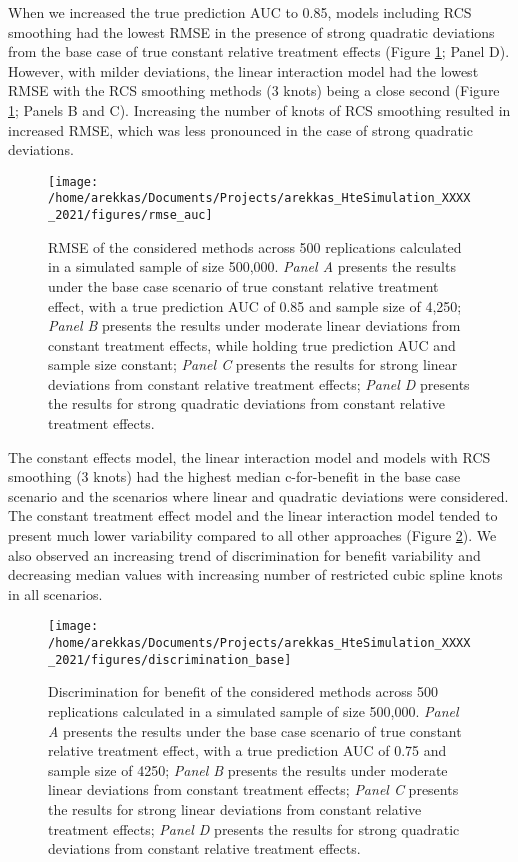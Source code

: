 \documentclass{article}
\begin{document}
When we increased the true prediction AUC to 0.85, models including RCS
smoothing had the lowest RMSE in the presence of strong quadratic
deviations from the base case of true constant relative treatment
effects (Figure \ref{fig:rmseauc}; Panel D). However, with milder
deviations, the linear interaction model had the lowest RMSE with the
RCS smoothing methods (3 knots) being a close second (Figure
\ref{fig:rmseauc}; Panels B and C). Increasing the number of knots of
RCS smoothing resulted in increased RMSE, which was less pronounced in
the case of strong quadratic deviations.

\begin{figure}
\texttt{[image: /home/arekkas/Documents/Projects/arekkas\_HteSimulation\_XXXX\_2021/figures/rmse\_auc]} \caption{RMSE of the considered methods across 500 replications calculated in a simulated sample of size 500,000. \textit{Panel A} presents the results under the base case scenario of true constant relative treatment effect, with a true prediction AUC of 0.85 and sample size of 4,250; \textit{Panel B} presents the results under moderate linear deviations from constant treatment effects, while holding true prediction AUC and sample size constant; \textit{Panel C} presents the results for strong linear deviations from constant relative treatment effects; \textit{Panel D} presents the results for strong quadratic deviations from constant relative treatment effects.}\label{fig:rmseauc}
\end{figure}

The constant effects model, the linear interaction model and models with
RCS smoothing (3 knots) had the highest median c-for-benefit in the base
case scenario and the scenarios where linear and quadratic deviations
were considered. The constant treatment effect model and the linear
interaction model tended to present much lower variability compared to
all other approaches (Figure \ref{fig:discrimination}). We also observed
an increasing trend of discrimination for benefit variability and
decreasing median values with increasing number of restricted cubic
spline knots in all scenarios.

\begin{figure}
\texttt{[image: /home/arekkas/Documents/Projects/arekkas\_HteSimulation\_XXXX\_2021/figures/discrimination\_base]} \caption{Discrimination for benefit of the considered methods across 500 replications calculated in a simulated sample of size 500,000. \textit{Panel A} presents the results under the base case scenario of true constant relative treatment effect, with a true prediction AUC of 0.75 and sample size of 4250; \textit{Panel B} presents the results under moderate linear deviations from constant treatment effects; \textit{Panel C} presents the results for strong linear deviations from constant relative treatment effects; \textit{Panel D} presents the results for strong quadratic deviations from constant relative treatment effects.}\label{fig:discrimination}
\end{figure}
\end{document}
